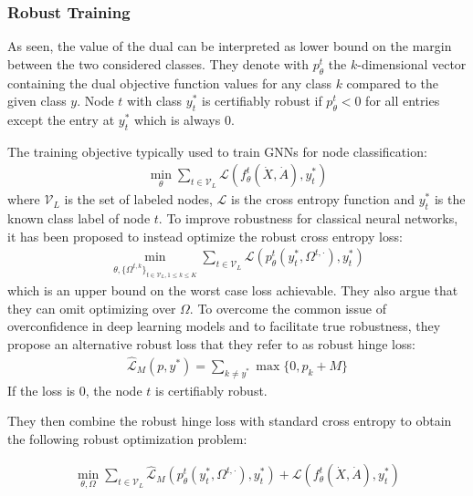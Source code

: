 \documentclass[a4paper,preprint]{sig-alternate}
\begin{document}
\subsubsection{Robust Training}

As seen, the value of the dual can be interpreted as lower bound on the margin between the two considered classes.
They denote with $p_{\theta}^t$ the $k$-dimensional vector containing the dual objective function values
for any class $k$ compared to the given class $y$. Node $t$ with class $y_t^{\ast}$ is certifiably robust if $p_{\theta}^t < 0$ for all entries
except the entry at $y_t^{\ast}$ which is always $0$.

The training objective typically used to train GNNs for node classification:
\begin{gather}
    \min_{\theta} \sum_{t \in \mathcal{V}_L} \mathcal{L} (f_{\theta}^t (\dot{X}, \dot{A}), y_t^{\ast})
\end{gather}
where $\mathcal{V}_L$ is the set of labeled nodes, $\mathcal{L}$ is the
cross entropy function and $y_t^{\ast}$ is the known class label of node $t$.
To improve robustness for classical neural networks, it has been proposed to instead optimize the robust cross entropy loss:
\begin{gather}
    \min_{\theta, \{\Omega^{t, k}\}_{t \in \mathcal{V}_L, 1 \leq k \leq K}} \sum_{t \in \mathcal{V}_L} \mathcal{L} (p_{\theta}^t (y_t^{\ast}, \Omega^{t, \cdot}), y_t^{\ast})
\end{gather}
which is an upper bound on the worst case loss achievable. They also argue that they can omit optimizing over $\Omega$.
To overcome the common issue of overconfidence in deep learning models and to facilitate true robustness, they propose an alternative
robust loss that they refer to as robust hinge loss:
\begin{gather}
    \mathcal{\hat{L}}_M (p, y^{\ast}) = \sum_{k \neq y^{\ast}} \max \{0, p_k + M\}
\end{gather}
If the loss is $0$, the node $t$ is certifiably robust.

They then combine the robust hinge loss with standard cross entropy to obtain the following robust optimization problem:

\begin{gather}
\label{eq:2}
    \min_{\theta, \Omega} \sum_{t \in \mathcal{V}_L} \mathcal{\hat{L}}_M (p_{\theta}^t (y_t^{\ast}, \Omega^{t, \cdot}), y_t^{\ast}) + \mathcal{L} (f_{\theta}^t (\dot{X}, \dot{A}), y_t^{\ast})
\end{gather}
\end{document}
